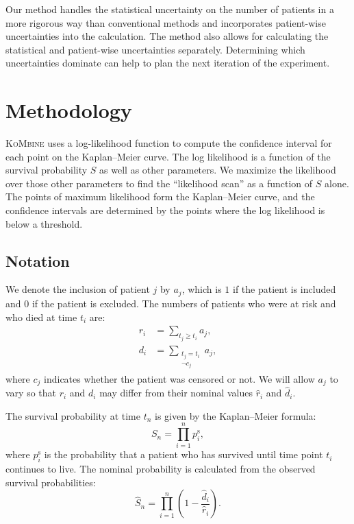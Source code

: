 \documentclass[pdflatex,sn-basic]{sn-jnl}%
\theoremstyle{thmstyleone}%
\theoremstyle{thmstyletwo}%
\theoremstyle{thmstylethree}%
\newcommand{\KM}{Kaplan--Meier} %
\newcommand{\KoMbine}{\textsc{KoMbine}}
\begin{document}
Our method handles the statistical uncertainty on the number of patients in a more rigorous way than conventional methods and incorporates patient-wise uncertainties into the calculation. The method also allows for calculating the statistical and patient-wise uncertainties separately. Determining which uncertainties dominate can help to plan the next iteration of the experiment.

\section{Methodology}\label{sec:methodology}

\KoMbine{} uses a log-likelihood function to compute the confidence interval for each point on the \KM{} curve. The log likelihood is a function of the survival probability \(S\) as well as other parameters. We maximize the likelihood over those other parameters to find the ``likelihood scan'' as a function of \(S\) alone. The points of maximum likelihood form the \KM{} curve, and the confidence intervals are determined by the points where the log likelihood is below a threshold.

\subsection{Notation}\label{sec:notation}

We denote the inclusion of patient \(j\) by \(a_j\), which is \(1\) if the patient is included and \(0\) if the patient is excluded. The numbers of patients who were at risk and who died at time \(t_i\) are:
\begin{align}
r_i &= \sum_{t_j \geq t_i} a_j, \\
d_i &= \sum_{\substack{t_j = t_i \\ \neg c_j}} a_j,
\end{align}
where \(c_j\) indicates whether the patient was censored or not. We will allow \(a_j\) to vary so that \(r_i\) and \(d_i\) may differ from their nominal values \(\hat{r}_i\) and \(\hat{d}_i\).

The survival probability at time \(t_n\) is given by the \KM{} formula:
\begin{equation}
S_n = \prod_{i=1}^{n} p_i^\text{s}, \label{eq:km-survival}
\end{equation}
where \(p_i^\text{s}\) is the probability that a patient who has survived until time point \(t_i\) continues to live. The nominal probability is calculated from the observed survival probabilities:
\begin{equation}
\hat{S}_n = \prod_{i=1}^{n} \left(1 - \frac{\hat{d}_i}{\hat{r}_i}\right). \label{eq:km-nominal}
\end{equation}
\end{document}
